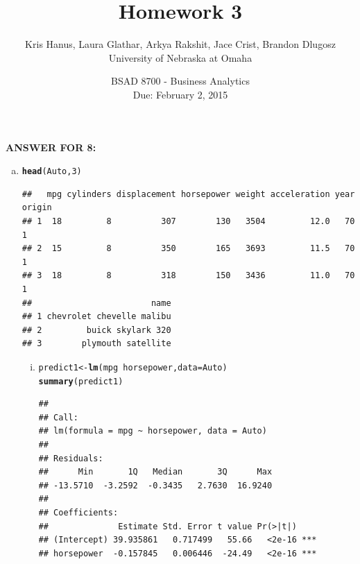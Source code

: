\documentclass{article}\usepackage[]{graphicx}\usepackage[]{color}
\makeatletter
\newcommand{\hlnum}[1]{\textcolor[rgb]{0.686,0.059,0.569}{#1}}%
\newcommand{\hlopt}[1]{\textcolor[rgb]{0,0,0}{#1}}%
\newcommand{\hlstd}[1]{\textcolor[rgb]{0.345,0.345,0.345}{#1}}%
\newcommand{\hlkwb}[1]{\textcolor[rgb]{0.69,0.353,0.396}{#1}}%
\newcommand{\hlkwc}[1]{\textcolor[rgb]{0.333,0.667,0.333}{#1}}%
\newcommand{\hlkwd}[1]{\textcolor[rgb]{0.737,0.353,0.396}{\textbf{#1}}}%
\newenvironment{kframe}{%
 \def\at@end@of@kframe{}%
 \ifinner\ifhmode%
  \def\at@end@of@kframe{\end{minipage}}%
  \begin{minipage}{\columnwidth}%
 \fi\fi%
 \def\FrameCommand##1{\hskip\@totalleftmargin \hskip-\fboxsep
 \colorbox{shadecolor}{##1}\hskip-\fboxsep
     \hskip-\linewidth \hskip-\@totalleftmargin \hskip\columnwidth}%
 \MakeFramed {\advance\hsize-\width
   \@totalleftmargin\z@ \linewidth\hsize
   \@setminipage}}%
 {\par\unskip\endMakeFramed%
 \at@end@of@kframe}
\newenvironment{knitrout}{}{} %
\makeatother
\begin{document}
\title{Homework 3}
\date{BSAD 8700 - Business Analytics\\ Due: February 2, 2015}
\author{Kris Hanus, Laura Glathar, Arkya Rakshit, Jace Crist, Brandon Dlugosz\\ University of Nebraska at Omaha}
\maketitle

\textbf{ANSWER FOR 8:} \\


\begin{enumerate}[(a)]
\item
\begin{knitrout}
\color{fgcolor}\begin{kframe}
\begin{alltt}
\hlkwd{head}\hlstd{(Auto,}\hlnum{3}\hlstd{)}
\end{alltt}
\begin{verbatim}
##   mpg cylinders displacement horsepower weight acceleration year origin
## 1  18         8          307        130   3504         12.0   70      1
## 2  15         8          350        165   3693         11.5   70      1
## 3  18         8          318        150   3436         11.0   70      1
##                        name
## 1 chevrolet chevelle malibu
## 2         buick skylark 320
## 3        plymouth satellite
\end{verbatim}
\end{kframe}
\end{knitrout}
\begin{enumerate}[(i)]
\item
\begin{knitrout}
\color{fgcolor}\begin{kframe}
\begin{alltt}
\hlstd{predict1}\hlkwb{<-}\hlkwd{lm}\hlstd{(mpg}\hlopt{~}\hlstd{horsepower,} \hlkwc{data}\hlstd{=Auto)}
\hlkwd{summary}\hlstd{(predict1)}
\end{alltt}
\begin{verbatim}
## 
## Call:
## lm(formula = mpg ~ horsepower, data = Auto)
## 
## Residuals:
##      Min       1Q   Median       3Q      Max 
## -13.5710  -3.2592  -0.3435   2.7630  16.9240 
## 
## Coefficients:
##              Estimate Std. Error t value Pr(>|t|)    
## (Intercept) 39.935861   0.717499   55.66   <2e-16 ***
## horsepower  -0.157845   0.006446  -24.49   <2e-16 ***

\end{verbatim}
\end{kframe}
\end{knitrout}
\end{enumerate}
\end{enumerate}
\end{document}
